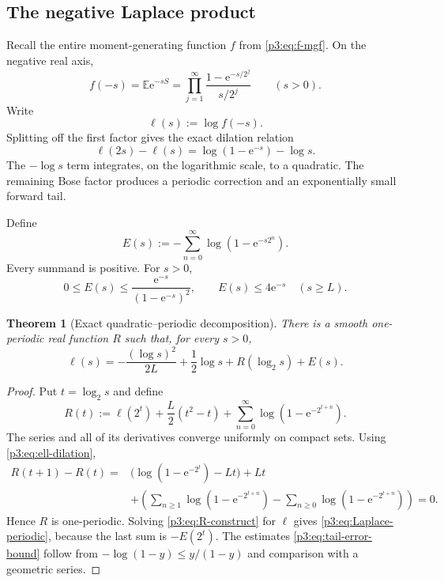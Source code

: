 \documentclass[11pt]{article}
\numberwithin{equation}{section}
\newtheorem{theorem}{Theorem}[section]
\theoremstyle{definition}
\theoremstyle{remark}
\newcommand{\e}{\mathrm e}
\begin{document}
\subsection{The negative Laplace product}

Recall the entire moment-generating function $f$ from \eqref{p3:eq:f-mgf}.  On
the negative real axis,
\begin{equation}\label{p3:eq:negative-Laplace-product}
 f(-s)=\mathbb E\e^{-sS}
 =\prod_{j=1}^{\infty}
   \frac{1-\e^{-s/2^j}}{s/2^j}
 \qquad(s>0).
\end{equation}
Write
\begin{equation}\label{p3:eq:ell-def}
 \ell(s):=\log f(-s).
\end{equation}
Splitting off the first factor gives the exact dilation relation
\begin{equation}\label{p3:eq:ell-dilation}
 \ell(2s)-\ell(s)=\log(1-\e^{-s})-\log s.
\end{equation}
The $-\log s$ term integrates, on the logarithmic scale, to a quadratic.  The
remaining Bose factor produces a periodic correction and an exponentially
small forward tail.

Define
\begin{equation}\label{p3:eq:forward-tail-error}
 E(s):=-\sum_{n=0}^{\infty}\log(1-\e^{-s2^n}).
\end{equation}
Every summand is positive.  For $s>0$,
\begin{equation}\label{p3:eq:tail-error-bound}
 0\le E(s)\le
 \frac{\e^{-s}}{(1-\e^{-s})^2},
 \qquad
 E(s)\le4\e^{-s}\quad(s\ge L).
\end{equation}

\begin{theorem}[Exact quadratic--periodic decomposition]\label{p3:thm:Laplace-periodic}
There is a smooth one-periodic real function $R$ such that, for every $s>0$,
\begin{equation}\label{p3:eq:Laplace-periodic}
\boxed{
 \ell(s)=-\frac{(\log s)^2}{2L}+\frac12\log s
       +R(\log_2s)+E(s).}
\end{equation}
\end{theorem}

\begin{proof}
Put $t=\log_2s$ and define
\begin{equation}\label{p3:eq:R-construct}
 R(t):=\ell(2^t)+\frac L2(t^2-t)
       +\sum_{n=0}^{\infty}\log(1-\e^{-2^{t+n}}).
\end{equation}
The series and all of its derivatives converge uniformly on compact sets.
Using \eqref{p3:eq:ell-dilation},
\begin{align*}
 R(t+1)-R(t)
 ={}&\bigl(\log(1-\e^{-2^t})-Lt\bigr)+Lt\\
 &+\left(\sum_{n\ge1}\log(1-\e^{-2^{t+n}})
       -\sum_{n\ge0}\log(1-\e^{-2^{t+n}})\right)=0.
\end{align*}
Hence $R$ is one-periodic.  Solving \eqref{p3:eq:R-construct} for $\ell$ gives
\eqref{p3:eq:Laplace-periodic}, because the last sum is $-E(2^t)$.
The estimates \eqref{p3:eq:tail-error-bound} follow from
$-\log(1-y)\le y/(1-y)$ and comparison with a geometric series.
\end{proof}
\end{document}

